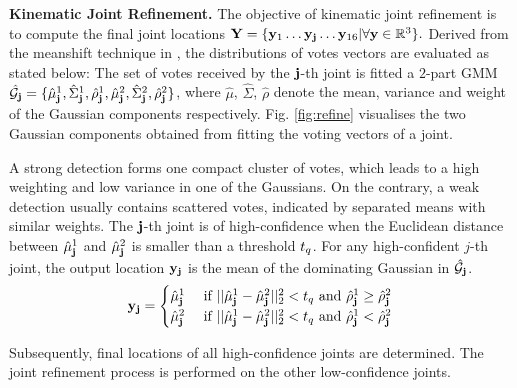 \noindent\textbf{Kinematic Joint Refinement. } 
The objective of kinematic joint refinement is to compute the final joint locations $\mathbf{Y} = \{ \mathbf{y}_{1} \dots \mathbf{y}_{\mathbf{j}} \dots \mathbf{y}_{16} | \forall \mathbf{y} \in \mathbb{R}^{3}\}. $
Derived from the meanshift technique in \cite{Girshick_ICCV_11}, the distributions of votes vectors are evaluated as stated below: 
The set of votes received by the $\mathbf{j}$-th joint is fitted a $2$-part GMM $\hat{\mathcal{G}}_{\mathbf{j}} = \{ \hat{\mu}_{\mathbf{j}}^{1}, \hat{\Sigma}_{\mathbf{j}}^{1}, \hat{\rho}_{\mathbf{j}}^{1}, \hat{\mu}_{\mathbf{j}}^{2}, \hat{\Sigma}_{\mathbf{j}}^{2}, \hat{\rho}_{\mathbf{j}}^{2} \}$, where $\hat{\mu}$, $\hat{\Sigma}$, $\hat{\rho}$ denote the mean, variance and weight of the Gaussian components respectively. Fig. \ref{fig:refine} visualises the two Gaussian components obtained from fitting the voting vectors of a joint.  

A strong detection forms one compact cluster of votes, which leads to a high weighting and low variance in one of the Gaussians. 
On the contrary, a weak detection usually contains scattered votes, indicated by separated means with similar weights. 
The $\mathbf{j}$-th joint is of high-confidence 
when the Euclidean distance between $\hat{\mu}_{\mathbf{j}}^{1}$ and $\hat{\mu}_{\mathbf{j}}^{2}$ is smaller than a threshold $t_{q}$. 
For any high-confident $j$-th joint, the output location $\mathbf{y}_{\mathbf{j}}$ is the mean of the dominating Gaussian in $\hat{\mathcal{G}}_{\mathbf{j}}$.  
\begin{equation}
	\mathbf{y}_{\mathbf{j}} = 
	\begin{cases}
		\hat{\mu}_{\mathbf{j}}^{1} & \mbox{ if } ||\hat{\mu}_{\mathbf{j}}^{1} - \hat{\mu}_{\mathbf{j}}^{2}||^2_2 < t_{q} \mbox{ and } \hat{\rho}_{\mathbf{j}}^{1} \ge \hat{\rho}_{\mathbf{j}}^{2} \\  
		\hat{\mu}_{\mathbf{j}}^{2} & \mbox{ if } ||\hat{\mu}_{\mathbf{j}}^{1} - \hat{\mu}_{\mathbf{j}}^{2}||^2_2 < t_{q} \mbox{ and } \hat{\rho}_{\mathbf{j}}^{1} < \hat{\rho}_{\mathbf{j}}^{2} \\  
	\end{cases}
	\label{eq:highconf}
\end{equation}

Subsequently, final locations of all high-confidence joints are determined. The joint refinement process is performed on the other low-confidence joints.   

